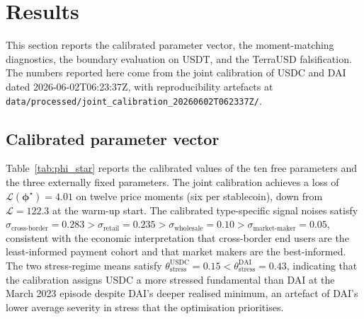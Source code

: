 \section{Results}\label{sec:results}

This section reports the calibrated parameter vector, the moment-matching diagnostics, the boundary evaluation on USDT, and the TerraUSD falsification. The numbers reported here come from the joint calibration of USDC and DAI dated 2026-06-02T06:23:37Z, with reproducibility artefacts at \texttt{data/processed/joint\_calibration\_20260602T062337Z/}.

\subsection{Calibrated parameter vector}\label{sub:phi_star}

Table~\ref{tab:phi_star} reports the calibrated values of the ten free parameters and the three externally fixed parameters. The joint calibration achieves a loss of $\mathcal{L}(\boldsymbol{\phi}^\star) = 4.01$ on twelve price moments (six per stablecoin), down from $\mathcal{L} = 122.3$ at the warm-up start. The calibrated type-specific signal noises satisfy $\sigma_{\text{cross-border}} = 0.283 > \sigma_{\text{retail}} = 0.235 > \sigma_{\text{wholesale}} = 0.10 > \sigma_{\text{market-maker}} = 0.05$, consistent with the economic interpretation that cross-border end users are the least-informed payment cohort and that market makers are the best-informed. The two stress-regime means satisfy $\theta_{\text{stress}}^{\text{USDC}} = 0.15 < \theta_{\text{stress}}^{\text{DAI}} = 0.43$, indicating that the calibration assigns USDC a more stressed fundamental than DAI at the March 2023 episode despite DAI's deeper realised minimum, an artefact of DAI's lower average severity in stress that the optimisation prioritises.

